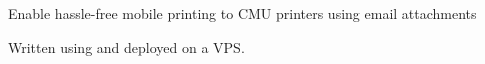 \documentclass[]{deedy-resume-openfont}
\begin{document}
\begin{minipage}[t]{0.66\textwidth}
\descript{}
\begin{tightemize}
\item Enable hassle-free mobile printing to CMU printers using email attachments
\item Written using  and  deployed on a
   VPS.
\end{tightemize}
\sectionsep


%
%






\end{minipage}
\end{document}
